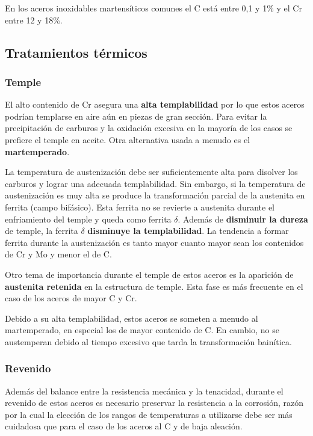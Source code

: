 En los aceros inoxidables martensíticos comunes el C está entre 0,1 y 1\% y el Cr entre 12 y 18\%.

\subsection{Tratamientos térmicos}

\subsubsection{Temple}
El alto contenido de Cr asegura una \textbf{alta templabilidad} por lo que estos aceros podrían templarse en aire aún en piezas de gran sección. Para evitar la precipitación de carburos y la oxidación excesiva en la mayoría de los casos se prefiere el temple en aceite. Otra alternativa usada a menudo es el \textbf{martemperado}.

La temperatura de austenización debe ser suficientemente alta para disolver los carburos y lograr una adecuada templabilidad. Sin embargo, si la temperatura de austenización es muy alta se produce la transformación parcial de la austenita en ferrita (campo bifásico). Esta ferrita no se revierte a austenita durante el enfriamiento del temple y queda como ferrita $\delta$. Además de \textbf{disminuir la dureza} de temple, la ferrita $\delta$ \textbf{disminuye la templabilidad}. La tendencia a formar ferrita durante la austenización es tanto mayor cuanto mayor sean los contenidos de Cr y Mo y menor el de C.

Otro tema de importancia durante el temple de estos aceros es la aparición de \textbf{austenita retenida} en la estructura de temple. Esta fase es más frecuente en el caso de los aceros de mayor C y Cr.

Debido a su alta templabilidad, estos aceros se someten a menudo al martemperado, en especial los de mayor contenido de C. En cambio, no se austemperan debido al tiempo excesivo que tarda la transformación bainítica.

\subsubsection{Revenido}

Además del balance entre la resistencia mecánica y la tenacidad, durante el revenido de estos aceros es necesario preservar la resistencia a la corrosión, razón por la cual la elección de los rangos de temperaturas a utilizarse debe ser más cuidadosa que para el caso de los aceros al C y de baja aleación.


